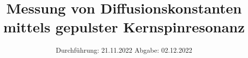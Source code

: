 

\subject{Versuch Nr.V49}
\title{Messung von Diffusionskonstanten mittels
gepulster Kernspinresonanz}
\date{%
  Durchführung: 21.11.2022
  \hspace{3em}
  Abgabe: 02.12.2022
}



\maketitle
\thispagestyle{empty}
\tableofcontents
\newpage 








\nocite{*}

\printbibliography{}


